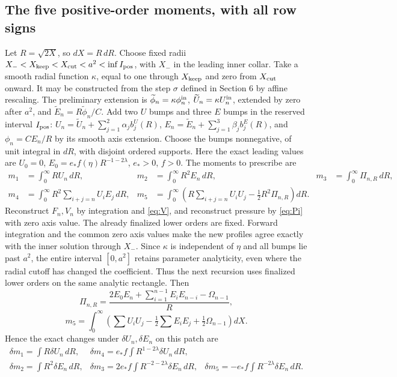 \documentclass[10pt,a4paper]{article}
\begin{document}
\subsection{The five positive-order moments, with all row signs}
Let $R=\sqrt{2X}$, so $dX=R\,dR$. Choose fixed radii
$X_-<X_{\rm keep}<X_{\rm cut}<a^2<\inf I_{\rm pos}$, with $X_-$ in the
leading inner collar. Take a smooth radial function $\kappa$, equal to one
through $X_{\rm keep}$ and zero from $X_{\rm cut}$ onward. It may be
constructed from the step $\sigma$ defined in Section 6 by affine rescaling.
The preliminary extension is
$\widetilde\phi_n=\kappa\phi_n^{\rm in}$,
$\widetilde U_n=\kappa U_n^{\rm in}$, extended by zero after $a^2$, and
$\widetilde E_n=R\widetilde\phi_n/C$.
Add two $U$ bumps and three $E$ bumps in the reserved interval $I_{\rm pos}$:
$U_n=\widetilde U_n+\sum_{j=1}^2\alpha_jb^U_j(R)$,
$E_n=\widetilde E_n+\sum_{j=1}^3\beta_jb^E_j(R)$,
and $\phi_n=CE_n/R$ by its smooth axis extension. Choose the bumps
nonnegative, of unit integral in $dR$, with disjoint ordered supports.
Here the exact leading values are
$U_0=0$, $E_0=e_*f(\eta)R^{-1-2\lambda}$, $e_*>0$, $f>0$.
The moments to prescribe are
\begin{align*}
m_1&=\int_0^\infty RU_n\,dR,&m_2&=\int_0^\infty R^2E_n\,dR,&
m_3&=\int_0^\infty\Pi_{n,R}\,dR,\\
m_4&=\int_0^\infty R^2\sum_{i+j=n}U_iE_j\,dR,&
m_5&=\int_0^\infty\left(R\sum_{i+j=n}U_iU_j-\tfrac12R^2\Pi_{n,R}\right)dR.
\end{align*}
Reconstruct $F_n,V_n$ by integration and \eqref{eq:V}, and reconstruct pressure
by \eqref{eq:Pi} with zero axis value. The already finalized lower orders are
fixed. Forward integration and the common zero axis values make the new
profiles agree exactly with the inner solution through $X_-$.
Since $\kappa$ is independent of $\eta$ and all bumps lie past $a^2$,
the entire interval $[0,a^2]$ retains parameter analyticity, even where
the radial cutoff has changed the coefficient. Thus the next recursion uses
finalized lower orders on the same analytic rectangle. Then
\[
\Pi_{n,R}=\frac{2E_0E_n+\sum_{i=1}^{n-1}E_iE_{n-i}-\Omega_{n-1}}{R},
\]
\[
m_5=\int_0^\infty\left(\sum U_iU_j-\tfrac12\sum E_iE_j+\tfrac12\Omega_{n-1}\right)dX.
\]
Hence the exact changes under $\delta U_n,\delta E_n$ on this patch are
\[
\begin{array}{lll}
\delta m_1=\int R\delta U_n\,dR,&
\delta m_4=e_*f\int R^{1-2\lambda}\delta U_n\,dR,\\
\delta m_2=\int R^2\delta E_n\,dR,&
\delta m_3=2e_*f\int R^{-2-2\lambda}\delta E_n\,dR,&
\delta m_5=-e_*f\int R^{-2\lambda}\delta E_n\,dR.
\end{array}
\]
\end{document}
